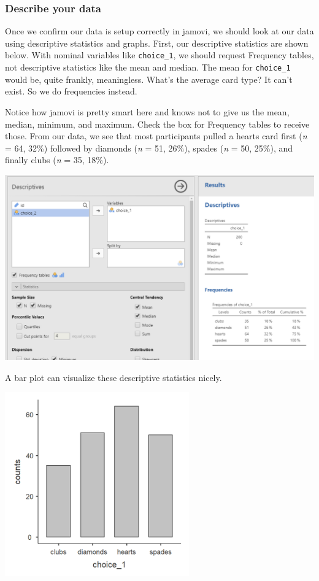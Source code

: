 \documentclass[
]{book}
\begin{document}
\hypertarget{describe-your-data}{%
\subsubsection{Describe your data}\label{describe-your-data}}

Once we confirm our data is setup correctly in jamovi, we should look at our data using descriptive statistics and graphs. First, our descriptive statistics are shown below. With nominal variables like \texttt{choice\_1}, we should request Frequency tables, not descriptive statistics like the mean and median. The mean for \texttt{choice\_1} would be, quite frankly, meaningless. What's the average card type? It can't exist. So we do frequencies instead.

Notice how jamovi is pretty smart here and knows not to give us the mean, median, minimum, and maximum. Check the box for Frequency tables to receive those. From our data, we see that most participants pulled a hearts card first (\emph{n} = 64, 32\%) followed by diamonds (\emph{n} = 51, 26\%), spades (\emph{n} = 50, 25\%), and finally clubs (\emph{n} = 35, 18\%).

\includegraphics{images/09-chi-square/chi-square_descriptives.png}

A bar plot can visualize these descriptive statistics nicely.

\includegraphics[width=3.125in,height=\textheight]{images/09-chi-square/chi-square_bar.png}
\end{document}
